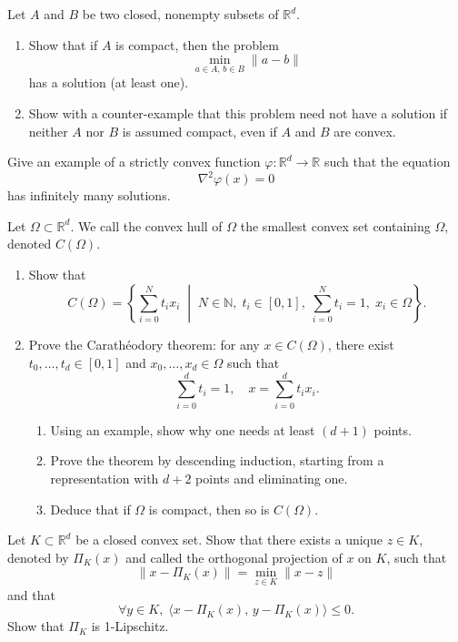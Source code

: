 

\begin{exercise}
Let $A$ and $B$ be two closed, nonempty subsets of $\mathbb{R}^d$.
\begin{enumerate}
  \item Show that if $A$ is compact, then the problem
  \[
    \min_{a \in A,\, b \in B} \|a-b\|
  \]
  has a solution (at least one).
  \item Show with a counter-example that this problem need not have a solution if neither $A$ nor $B$ is assumed compact, even if $A$ and $B$ are convex.
\end{enumerate}
\end{exercise}

\begin{exercise}
Give an example of a strictly convex function $\varphi : \mathbb{R}^d \to \mathbb{R}$ such that the equation
\[
\nabla^2 \varphi(x) = 0
\]
has infinitely many solutions.
\end{exercise}

\begin{exercise}
Let $\Omega \subset \mathbb{R}^d$. We call the convex hull of $\Omega$ the smallest convex set containing $\Omega$, denoted $C(\Omega)$.
\begin{enumerate}
  \item Show that
  \[
    C(\Omega) =
    \left\{ \sum_{i=0}^{N} t_i x_i \;\middle|\; N \in \mathbb{N}, \; t_i \in [0,1], \; \sum_{i=0}^{N} t_i = 1,\; x_i \in \Omega \right\}.
  \]
  \item Prove the Carathéodory theorem: for any $x \in C(\Omega)$, there exist $t_0, \dots, t_d \in [0,1]$ and $x_0, \dots, x_d \in \Omega$ such that
  \[
    \sum_{i=0}^d t_i = 1, 
    \quad 
    x = \sum_{i=0}^d t_i x_i.
  \]
  \begin{enumerate}
    \item Using an example, show why one needs at least $(d+1)$ points.
    \item Prove the theorem by descending induction, starting from a representation with $d+2$ points and eliminating one.
    \item Deduce that if $\Omega$ is compact, then so is $C(\Omega)$.
  \end{enumerate}
\end{enumerate}
\end{exercise}

\begin{exercise}
Let $K \subset \mathbb{R}^d$ be a closed convex set. Show that there exists a unique $z \in K$, denoted by $\Pi_K(x)$ and called the orthogonal projection of $x$ on $K$, such that
\[
\|x - \Pi_K(x)\| = \min_{z \in K} \|x-z\|
\]
and that
\[
\forall y \in K,\; \langle x - \Pi_K(x),\, y - \Pi_K(x)\rangle \leq 0.
\]
Show that $\Pi_K$ is 1-Lipschitz.
\end{exercise}

